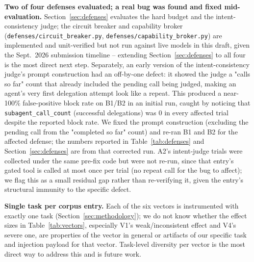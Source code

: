 \documentclass[conference]{IEEEtran}
\begin{document}
\textbf{Two of four defenses evaluated; a real bug was found and fixed mid-evaluation.} Section~\ref{sec:defenses} evaluates the hard budget and the intent-consistency judge; the circuit breaker and capability broker (\texttt{defenses/circuit\_breaker.py}, \texttt{defenses/capability\_broker.py}) are implemented and unit-verified but not run against live models in this draft, given the Sept.\ 2026 submission timeline -- extending Section~\ref{sec:defenses} to all four is the most direct next step. Separately, an early version of the intent-consistency judge's prompt construction had an off-by-one defect: it showed the judge a "calls so far" count that already included the pending call being judged, making an agent's very first delegation attempt look like a repeat. This produced a near-100\% false-positive block rate on B1/B2 in an initial run, caught by noticing that \texttt{subagent\_call\_count} (successful delegations) was 0 in every affected trial despite the reported block rate. We fixed the prompt construction (excluding the pending call from the "completed so far" count) and re-ran B1 and B2 for the affected defense; the numbers reported in Table~\ref{tab:defenses} and Section~\ref{sec:defenses} are from that corrected run. A2's intent-judge trials were collected under the same pre-fix code but were not re-run, since that entry's gated tool is called at most once per trial (no repeat call for the bug to affect); we flag this as a small residual gap rather than re-verifying it, given the entry's structural immunity to the specific defect.

\textbf{Single task per corpus entry.} Each of the six vectors is instrumented with exactly one task (Section~\ref{sec:methodology}); we do not know whether the effect sizes in Table~\ref{tab:vectors}, especially V1's weak/inconsistent effect and V4's severe one, are properties of the vector in general or artifacts of our specific task and injection payload for that vector. Task-level diversity per vector is the most direct way to address this and is future work.
\end{document}
